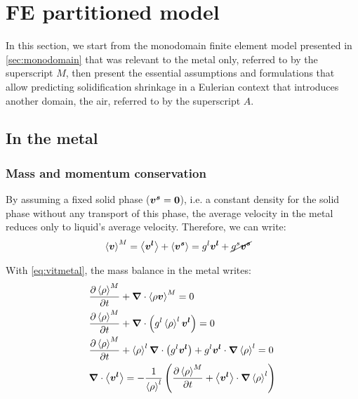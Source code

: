
\section{FE partitioned model}
 
In this section, we start from the monodomain finite element model 
presented in \cref{sec:monodomain} that was relevant to the metal only, 
referred to by the superscript $M$, then present the essential assumptions and formulations 
that allow predicting solidification shrinkage in a Eulerian context that introduces
another domain, the air, referred to by the superscript $A$.

\subsection{In the metal}

\subsubsection{Mass and momentum conservation}

By assuming a fixed solid phase ($\boldsymbol{v^s}=\boldsymbol{0}$), i.e. a constant density for the solid phase without any transport of this phase, 
the average velocity in the metal reduces only to liquid's average velocity. Therefore, we can write:
\begin{align}
\label{eq:vitmetal}
& \vM = \vit + \avg{\vs} = \gl \vl + \cancel{\gs \vs}
\end{align}

With \cref{eq:vitmetal}, the mass balance in the metal writes:
\begin{subequations}
\begin{align}
& \tempup{\avg{\rho}^M} + \nabvec \cdot \avg{\rho \vec{v}}^M  = 0 \\ 
& \tempup{\avg{\rho}^M} + \nabvec \cdot \brac{ \gl \rhol \vl} = 0 \\ 
& \tempup{\avg{\rho}^M} + \rhol \nabvec \cdot \brac{ \gl \vl} 
	+ \gl \vl \cdot  \nabvec \rhol = 0 \\	
\label{eq:mass_balance_metal}
& \nabvec \cdot \vit 
= -\frac{1}{\rhol} \brac{\tempup{\avg{\rho}^M }+ \vit \cdot  \nabvec \rhol}
\end{align}
\end{subequations}

